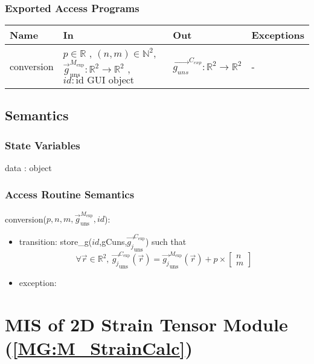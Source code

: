 \documentclass[12pt, titlepage]{article}
\begin{document}
\subsubsection{Exported Access Programs}

\begin{center}
\begin{tabular}{p{2cm} p{4cm} p{4cm} p{2cm}}
\hline
\textbf{Name} & \textbf{In} & \textbf{Out} & \textbf{Exceptions} \\
\hline
conversion & $p \in \mathbb{R}$ , $(n,m) \in \mathbb{N}^2$, $\overrightarrow{g}_{\text{uns}}^{M_{\text{exp}}}:\mathbb{R}^2\rightarrow\mathbb{R}^2$ , $id : \text{id GUI object}$  & $\overrightarrow{g_{uns}}^{C_{exp}}:\mathbb{R}^2\rightarrow\mathbb{R}^2$ & - \\
\hline
\end{tabular}
\end{center}

\subsection{Semantics}

\subsubsection{State Variables}
data : object

\subsubsection{Access Routine Semantics}

\noindent conversion($p,n,m,\overrightarrow{g}_{\text{uns}}^{M_{\text{exp}}},id$):
\begin{itemize}
\item transition: store{\_}g($id$,gCuns,$\overrightarrow{g_{j}}_{\text{uns}}^{C_{\text{exp}}}$) such that
	\begin{equation*}
	\forall \vec{r} \in \mathbb{R}^2, \
	\overrightarrow{g_{j}}_{\text{uns}}^{C_{\text{exp}}}(\vec{r})= \overrightarrow{g_{j}}_{\text{uns}}^{M_{\text{exp}}}(\vec{r}) + p \times \begin{bmatrix}
	n \\
	m
	\end{bmatrix}
	\end{equation*}
\item exception:  
\end{itemize}

\section{MIS of 2D Strain Tensor Module (\texorpdfstring{\cref{MG:M_StrainCalc}}))} \label{MIS_StrainCalc}
\end{document}
